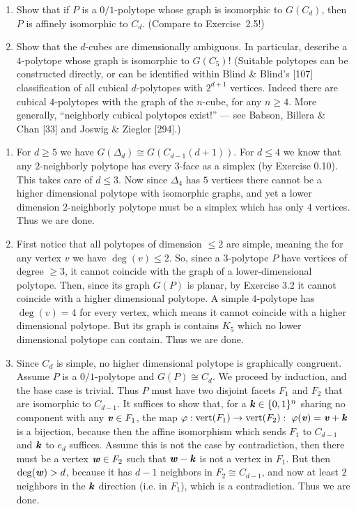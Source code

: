 \documentclass{article}
\begin{document}
\begin{enumerate}
\begin{enumerate}[label=(\roman*)]
\item Show that if $P$ is a $0/1$-polytope whose graph is isomorphic to $G(C_d)$, then $P$ is affinely isomorphic to $C_d$. (Compare to Exercise~2.5!)

\item Show that the $d$-cubes are dimensionally ambiguous. In particular, describe a $4$-polytope whose graph is isomorphic to $G(C_5)$! (Suitable polytopes can be constructed directly, or can be identified within Blind \& Blind's [107] classification of all cubical $d$-polytopes with $2^{d+1}$ vertices. Indeed there are cubical $4$-polytopes with the graph of the $n$-cube, for any $n \ge 4$. More generally, ``neighborly cubical polytopes exist!'' --- see Babson, Billera \& Chan [33] and Joswig \& Ziegler [294].)

\end{enumerate}

\begin{solution}
\begin{enumerate}[label=(\roman*)]
\item For $d \geq 5$ we have $G(\Delta_d) \cong G(C_{d-1}(d+1))$. For $d \leq 4$ we know that any $2$-neighborly polytope has every $3$-face as a simplex (by Exercise 0.10). This takes care of $d \leq 3$. Now since $\Delta_4$ has $5$ vertices there cannot be a higher dimensional polytope with isomorphic graphs, and yet a lower dimension $2$-neighborly polytope must be a simplex which has only $4$ vertices. Thus we are done.

\item First notice that all polytopes of dimension $\leq 2$ are simple, meaning the for any vertex $v$ we have $\deg(v) \leq 2$. So, since a $3$-polytope $P$ have vertices of degree $\geq 3$, it cannot coincide with the graph of a lower-dimensional polytope. Then, since its graph $G(P)$ is planar, by Exercise 3.2 it cannot coincide with a higher dimensional polytope. A simple $4$-polytope has $\deg(v) = 4$ for every vertex, which means it cannot coincide with a higher dimensional polytope. But its graph is contains $K_5$ which no lower dimensional polytope can contain. Thus we are done.

\item Since $C_d$ is simple, no higher dimensional polytope is graphically congruent. Assume $P$ is a $0/1$-polytope and $G(P) \cong C_d$. We proceed by induction, and the base case is trivial. Thus $P$ must have two disjoint facets $F_1$ and $F_2$ that are isomorphic to $C_{d-1}$. It suffices to show that, for a $\textbf{\textit{k}} \in \{0,1\}^n$ sharing no component with any $\textbf{\textit{v}}\in F_1$, the map $\varphi: \operatorname{vert}(F_1) \to \operatorname{vert}(F_2): \; \varphi(\textbf{\textit{v}}) = \textbf{\textit{v}}+\textbf{\textit{k}}$ is a bijection, because then the affine isomorphism which sends $F_1$ to $C_{d-1}$ and $\textbf{\textit{k}}$ to $e_d$ suffices. Assume this is not the case by contradiction, then there must be a vertex $\textbf{\textit{w}} \in F_2$ such that $\textbf{\textit{w}} - \textbf{\textit{k}}$ is not a vertex in $F_1$. But then $\deg(\textbf{\textit{w}}) > d$, because it has $d-1$ neighbors in $F_2 \cong C_{d-1}$, and now at least $2$ neighbors in the $\textbf{\textit{k}}$ direction (i.e. in $F_1$), which is a contradiction. Thus we are done.


\end{enumerate}
\end{solution}
\end{enumerate}
\end{document}
